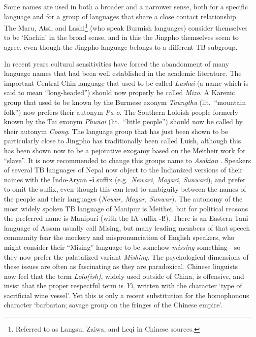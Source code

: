 Some names are used in both a broader and a narrower sense, both for a
specific language and for a group of languages that share a close contact
relationship. The Maru, Atsi, and Lashi\footnote{Referred to as Langsu, Zaiwa,
and Leqi in Chinese sources.} (who speak Burmish languages) consider themselves
to be ‘Kachin’ in the broad sense, and in this the Jingpho themselves seem to
agree, even though the Jingpho language belongs to a different TB subgroup.


In recent years cultural sensitivities have forced the abandonment of many
language names that had been well established in the academic literature. The
important Central Chin language that used to be called \textit{Lushai} (a name which is
said to mean “long-headed”) should now properly be called \textit{Mizo}.
A Karenic group
that used to be known by the Burmese exonym \textit{Taungthu} (lit.\ “mountain folk”) now
prefers their autonym \textit{Pa-o}. The Southern Loloish people
formerly known by the Tai exonym \textit{Phunoi} (lit.\ “little people”) should now be
called by their autonym \textit{Coong}. The language group that has just been shown to be particularly close to Jingpho has traditionally been called Luish, although this has been shown now to be a pejorative exogamy based on the Meitheir work for “slave”. It is now recommended to change this groups name to \textit{Asakian} \citealt{JAM-2013}.
Speakers of several TB languages of Nepal now
object to the Indianized versions of their names with the Indo-Aryan \textbf{-i} suffix
(e.g.\ \textit{Newari, Magari, Sunwari}), and prefer to omit the suffix, even though this
can lead to ambiguity between the names of the people and their languages
(\textit{Newar, Magar, Sunwar}). 
The autonomy of the most widely spoken TB language of Manipur is Meithei, but for political reasons the preferred name is Manipuri (with the IA suffix \textbf{-i}!).
There is an Eastern Tani language of Assam usually call Mising, but many leading members of that speech community fear the mockery and mispronunciation of English speakers, who might consider their “Mising” language to be somehow \textit{missing} something—so they now prefer the palatalized variant \textit{Mishing}. The psychological dimensions of these issues are often
as fascinating as they are paradoxical. Chinese linguists now feel that the
term \textit{Lolo(ish)}, widely used outside of China,
is offensive, and insist that the
proper respectful term is \textit{Yi}, written with the character  ‘type of
sacrificial wine vessel’. Yet this is only a recent substitution for the
homophonous character  ‘barbarian; savage group on the fringes of the Chinese
empire’.

